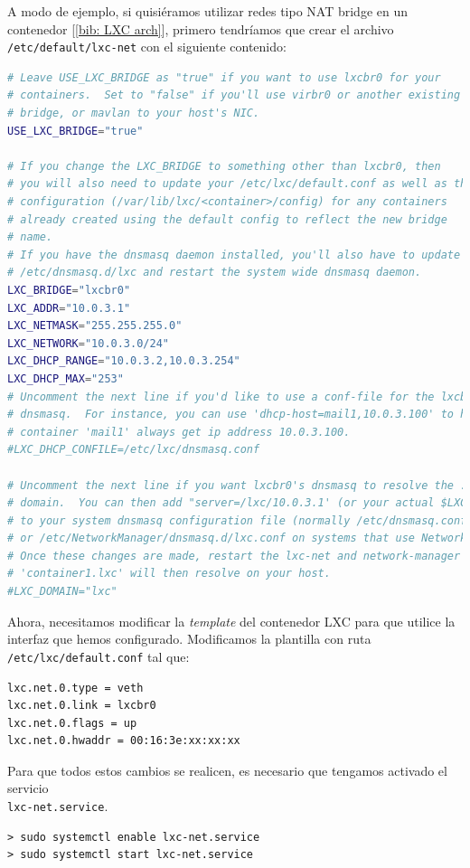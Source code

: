\documentclass[a4paper, oneside, 12pt]{book}
\begin{document}
	\noindent A modo de ejemplo, si quisiéramos utilizar redes tipo NAT bridge en un contenedor [\ref{bib: LXC arch}], primero tendríamos que crear el archivo \texttt{/etc/default/lxc-net} con el siguiente contenido:
	\begin{lstlisting}[language=Bash, caption={Configuración interfaz NAT bridge en LXC}]
# Leave USE_LXC_BRIDGE as "true" if you want to use lxcbr0 for your
# containers.  Set to "false" if you'll use virbr0 or another existing
# bridge, or mavlan to your host's NIC.
USE_LXC_BRIDGE="true"

# If you change the LXC_BRIDGE to something other than lxcbr0, then
# you will also need to update your /etc/lxc/default.conf as well as the
# configuration (/var/lib/lxc/<container>/config) for any containers
# already created using the default config to reflect the new bridge
# name.
# If you have the dnsmasq daemon installed, you'll also have to update
# /etc/dnsmasq.d/lxc and restart the system wide dnsmasq daemon.
LXC_BRIDGE="lxcbr0"
LXC_ADDR="10.0.3.1"
LXC_NETMASK="255.255.255.0"
LXC_NETWORK="10.0.3.0/24"
LXC_DHCP_RANGE="10.0.3.2,10.0.3.254"
LXC_DHCP_MAX="253"
# Uncomment the next line if you'd like to use a conf-file for the lxcbr0
# dnsmasq.  For instance, you can use 'dhcp-host=mail1,10.0.3.100' to have
# container 'mail1' always get ip address 10.0.3.100.
#LXC_DHCP_CONFILE=/etc/lxc/dnsmasq.conf

# Uncomment the next line if you want lxcbr0's dnsmasq to resolve the .lxc
# domain.  You can then add "server=/lxc/10.0.3.1' (or your actual $LXC_ADDR)
# to your system dnsmasq configuration file (normally /etc/dnsmasq.conf,
# or /etc/NetworkManager/dnsmasq.d/lxc.conf on systems that use NetworkManager).
# Once these changes are made, restart the lxc-net and network-manager services.
# 'container1.lxc' will then resolve on your host.
#LXC_DOMAIN="lxc"
	\end{lstlisting}

	\pagebreak

	\noindent Ahora, necesitamos modificar la \textit{template} del contenedor LXC para que utilice la interfaz que hemos configurado. Modificamos la plantilla con ruta \texttt{/etc/lxc/default.conf} tal que:
	\begin{lstlisting}[language=Bash, caption={Configuración contenedor LXC para usar NAT bridge}]
lxc.net.0.type = veth
lxc.net.0.link = lxcbr0
lxc.net.0.flags = up
lxc.net.0.hwaddr = 00:16:3e:xx:xx:xx
	\end{lstlisting}

	\noindent Para que todos estos cambios se realicen, es necesario que tengamos activado el servicio \\ \texttt{lxc-net.service}.
	\begin{verbatim}
> sudo systemctl enable lxc-net.service
> sudo systemctl start lxc-net.service
	\end{verbatim}
\end{document}
